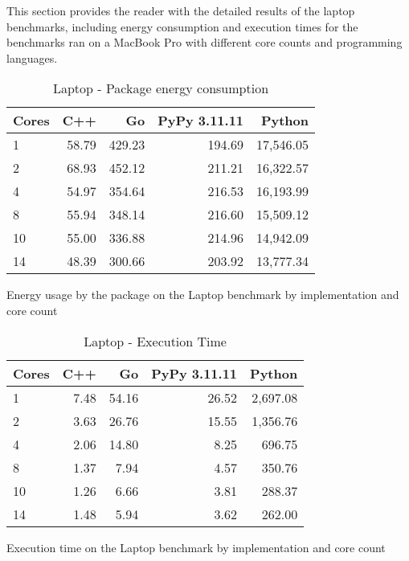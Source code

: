 This section provides the reader with the detailed results of the laptop benchmarks, including energy consumption and execution times for the benchmarks ran on a MacBook Pro with different core counts and programming languages.

\begin{table}[H]
    \centering
    \begin{tabular}{lrrrr}
        \hline
        Cores & C++   & Go       & PyPy 3.11.11 & Python      \\
        \hline
        1     & 58.79  & 429.23  & 194.69       & 17,546.05   \\
        2     & 68.93  & 452.12  & 211.21       & 16,322.57   \\
        4     & 54.97  & 354.64  & 216.53       & 16,193.99   \\
        8     & 55.94  & 348.14  & 216.60       & 15,509.12   \\
        10    & 55.00  & 336.88  & 214.96       & 14,942.09   \\
        14    & 48.39  & 300.66  & 203.92       & 13,777.34   \\
        \hline
    \end{tabular}
\caption{Laptop - Package energy consumption}{Energy usage by the package on the Laptop benchmark by implementation and core count}
\label{tab:mbp-power-consumption}
\end{table}

\begin{table}[H]
    \centering
    \begin{tabular}{lrrrr}
        \hline
        Cores & C++  & Go    & PyPy 3.11.11 & Python    \\
        \hline
        1     & 7.48  & 54.16  & 26.52        & 2,697.08  \\
        2     & 3.63  & 26.76  & 15.55        & 1,356.76  \\
        4     & 2.06  & 14.80  & 8.25         & 696.75    \\
        8     & 1.37  & 7.94   & 4.57         & 350.76    \\
        10    & 1.26  & 6.66   & 3.81         & 288.37    \\
        14    & 1.48  & 5.94   & 3.62         & 262.00    \\
        \hline
    \end{tabular}
\caption{Laptop - Execution Time}{Execution time on the Laptop benchmark by implementation and core count}
\label{tab:mbp-time-execution}
\end{table}


